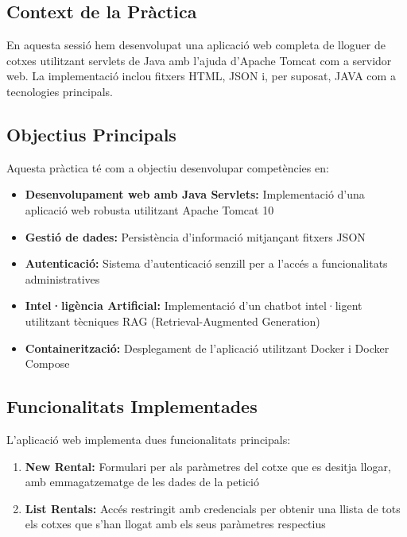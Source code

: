 \documentclass[12pt,a4paper]{article}
\begin{document}
\subsection{Context de la Pràctica}

En aquesta sessió hem desenvolupat una aplicació web completa de lloguer de cotxes utilitzant servlets de Java amb l'ajuda d'Apache Tomcat com a servidor web. La implementació inclou fitxers HTML, JSON i, per suposat, JAVA com a tecnologies principals.

\subsection{Objectius Principals}

Aquesta pràctica té com a objectiu desenvolupar competències en:

\begin{itemize}
    \item \textbf{Desenvolupament web amb Java Servlets:} Implementació d'una aplicació web robusta utilitzant Apache Tomcat 10
    \item \textbf{Gestió de dades:} Persistència d'informació mitjançant fitxers JSON
    \item \textbf{Autenticació:} Sistema d'autenticació senzill per a l'accés a funcionalitats administratives
    \item \textbf{Intel·ligència Artificial:} Implementació d'un chatbot intel·ligent utilitzant tècniques RAG (Retrieval-Augmented Generation)
    \item \textbf{Containerització:} Desplegament de l'aplicació utilitzant Docker i Docker Compose
\end{itemize}

\subsection{Funcionalitats Implementades}

L'aplicació web implementa dues funcionalitats principals:

\begin{enumerate}
    \item \textbf{New Rental:} Formulari per als paràmetres del cotxe que es desitja llogar, amb emmagatzematge de les dades de la petició
    \item \textbf{List Rentals:} Accés restringit amb credencials per obtenir una llista de tots els cotxes que s'han llogat amb els seus paràmetres respectius
\end{enumerate}
\end{document}
